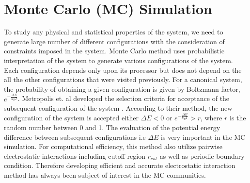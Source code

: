 \section{Monte Carlo (MC) Simulation}
To study any physical and statistical properties of the system, we need to generate large number of different configurations with the consideration of constraints imposed in the system. Monte Carlo method uses probabilistic interpretation of the system to generate various configurations of the system. Each configuration depends only upon its processor but does not depend on the all the other configurations that were visited previously. For a canonical system, the probability of obtaining a given configuration is given by Boltzmann factor, $e^{-\frac{\Delta E}{k_B T}}$. Metropolis et. al developed the selection criteria for acceptance of the subsequent configuration of the system \cite{Metropolis53}. According to their method, the new configuration of the system is accepted either  $\Delta E < 0$ or  $e^{-\frac{\Delta E}{k_B T}} > r$, where $r$ is the random number between 0 and 1. The evaluation of the potential energy difference between subsequent configurations i.e $\Delta E$ is very important in the MC simulation. For computational efficiency, this method also utilize pairwise electrostatic interactions including cutoff region $r_{cut}$ as well as periodic boundary condition. Therefore developing efficient and accurate electrostatic interaction method has always been subject of interest in the MC communities. 

